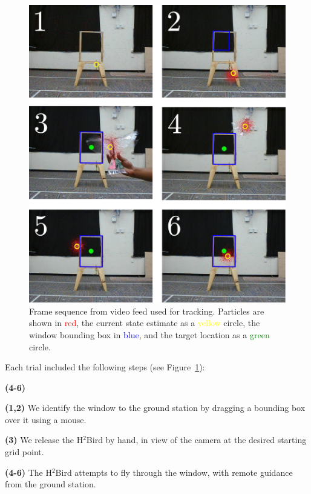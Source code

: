 \documentclass{aamas2013}
\newenvironment{spaced_description}[1]
  {\begin{list}{}%
   {\renewcommand\makelabel[1]{##1:\hfill}%
   \settowidth\labelwidth{\makelabel{#1}}%
   \setlength\leftmargin{\labelwidth}
   \addtolength\leftmargin{\labelsep}}}
  {\end{list}}
\begin{document}
\begin{figure}[tb]
\centering
\includegraphics[width=\linewidth]{figures/pf_screencap.pdf}
\caption{Frame sequence from video feed used for tracking. Particles 
are shown in \textcolor{red}{red}, the current state estimate as a 
\textcolor{yellow}{yellow} circle, the window bounding box in
\textcolor{blue}{blue}, and the target location as a \textcolor{green}{green} 
circle.}
\label{fig:pf_screencap}
\end{figure}

Each trial included the following steps (see Figure~\ref{fig:pf_screencap}):
\begin{spaced_description}{\textbf{(4-6)}}
\item[\textbf{(1,2)}] We identify the window to the ground station by dragging a bounding 
box over it using a mouse. 
\item[\textbf{(3)}] We release the H$^2$Bird by hand, in view of the camera at the desired 
starting grid point.
\item[\textbf{(4-6)}] The H$^2$Bird attempts to fly through the window, with remote 
guidance from the ground station.
\end{spaced_description}
\end{document}
